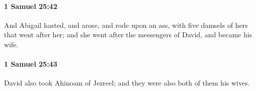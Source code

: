 		\paragraph{1 Samuel 25:42} %
			\label{1SAMUEL-25-42}

			And Abigail hasted, and arose, and rode upon an ass, with five damsels of hers that went after her; and she went after the messengers of David, and became his wife.


		\paragraph{1 Samuel 25:43} %
			\label{1SAMUEL-25-43}

			David also took Ahinoam of Jezreel; and they were also both of them his wives.


